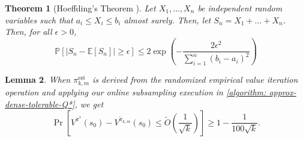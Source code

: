 \documentclass{article}
\theoremstyle{plain}
\newtheorem{theorem}{Theorem}[section]
\newtheorem{lemma}[theorem]{Lemma}
\theoremstyle{definition}
\def\est{\mathrm{est}}
\def\E{\mathbb{E}}
\begin{document}
\begin{theorem}[Hoeffding's Theorem \citep{10.5555/1522486}] Let $X_1,\dots,X_n$ be independent random variables such that $a_i\leq X_i\leq b_i$ almost surely. Then, let $S_n = X_1 + \dots + X_n$. Then, for all $\epsilon>0$,
\begin{equation}\mathbb{P}[|S_n - \E[S_n]|\geq \epsilon] \leq 2\exp\left(-\frac{2\epsilon^2}{\sum_{i=1}^n (b_i-a_i)^2}\right)\end{equation}
\end{theorem}
\begin{lemma}When ${\pi}^\est_{k,m}$ is derived from the randomized empirical value iteration operation and applying our online subsampling execution in \cref{algorithm: approx-dense-tolerable-Q*}, we get\label{PDL: stochastic}
    \begin{equation}\Pr\left[V^{\pi^*}(s_0) - V^{\tilde{\pi}_{k,m}}(s_0) \leq \tilde{O}\left(\frac{1}{\sqrt{k}}\right)\right]\geq 1-\frac{1}{100\sqrt{k}}.\end{equation}
    \end{lemma}
\end{document}
